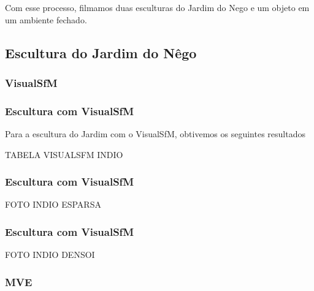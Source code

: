 \documentclass[table, usenames, svgnames, xcolor=dvipsnames]{beamer}
\begin{document}
\begin{frame}
	\begin{center}
		Com esse processo, filmamos duas esculturas do Jardim do Nego e um objeto em um ambiente fechado. 
	\end{center}
\end{frame}

\subsection{Escultura do Jardim do Nêgo}


\subsubsection{VisualSfM}

\begin{frame}
	\begin{center}
	\end{center}
\end{frame}

\begin{frame}
\frametitle{\textbf{Escultura com VisualSfM}}
	Para a escultura do Jardim com o VisualSfM, obtivemos os seguintes resultados
	
	TABELA VISUALSFM INDIO
\end{frame}

\begin{frame}
\frametitle{\textbf{Escultura com VisualSfM}}
	FOTO INDIO ESPARSA
\end{frame}

\begin{frame}
\frametitle{\textbf{Escultura com VisualSfM}}
FOTO INDIO DENSOI
\end{frame}

\subsubsection{MVE}
\begin{frame}
	\begin{center}
	\end{center}
\end{frame}
\end{document}
